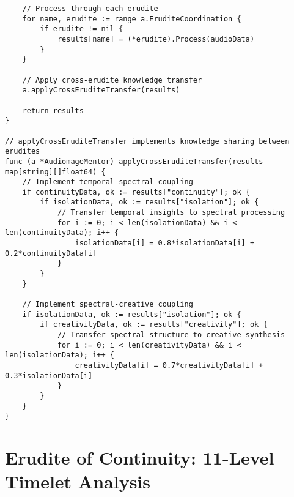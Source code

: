\begin{tcolorbox}[colback=CodeBackground, colframe=DarkGray, title=Audiomage Mentor Implementation, fonttitle=\bfseries]
\begin{verbatim}
    // Process through each erudite
    for name, erudite := range a.EruditeCoordination {
        if erudite != nil {
            results[name] = (*erudite).Process(audioData)
        }
    }
    
    // Apply cross-erudite knowledge transfer
    a.applyCrossEruditeTransfer(results)
    
    return results
}

// applyCrossEruditeTransfer implements knowledge sharing between erudites
func (a *AudiomageMentor) applyCrossEruditeTransfer(results map[string][]float64) {
    // Implement temporal-spectral coupling
    if continuityData, ok := results["continuity"]; ok {
        if isolationData, ok := results["isolation"]; ok {
            // Transfer temporal insights to spectral processing
            for i := 0; i < len(isolationData) && i < len(continuityData); i++ {
                isolationData[i] = 0.8*isolationData[i] + 0.2*continuityData[i]
            }
        }
    }
    
    // Implement spectral-creative coupling
    if isolationData, ok := results["isolation"]; ok {
        if creativityData, ok := results["creativity"]; ok {
            // Transfer spectral structure to creative synthesis
            for i := 0; i < len(creativityData) && i < len(isolationData); i++ {
                creativityData[i] = 0.7*creativityData[i] + 0.3*isolationData[i]
            }
        }
    }
}
\end{verbatim}
\end{tcolorbox}

\section{Erudite of Continuity: 11-Level Timelet Analysis}

